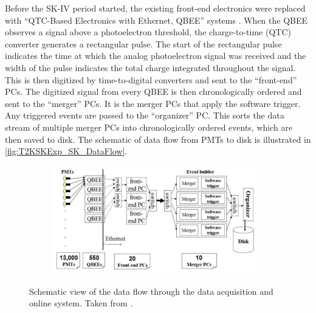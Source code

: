 Before the SK-IV period started, the existing front-end electronics were replaced with ``QTC-Based Electronics with Ethernet, QBEE'' systems \cite{Nishino2009-wh}. When the QBEE observes a signal above a  photoelectron threshold, the charge-to-time (QTC) converter generates a rectangular pulse. The start of the rectangular pulse indicates the time at which the analog photoelectron signal was received and the width of the pulse indicates the total charge integrated throughout the signal. This is then digitized by time-to-digital converters and sent to the ``front-end'' PCs. The digitized signal from every QBEE is then chronologically ordered and sent to the ``merger'' PCs. It is the merger PCs that apply the software trigger. Any triggered events are passed to the ``organizer'' PC. This sorts the data stream of multiple merger PCs into chronologically ordered events, which are then saved to disk. The schematic of data flow from PMTs to disk is illustrated in \autoref{fig:T2KSKExp_SK_DataFlow}.

\begin{figure}[h]
  \begin{subfigure}[t]{0.80\textwidth}
    \includegraphics[width=\textwidth, trim={0mm 0mm 0mm 0mm}, clip,page=1]{Figures/Detectors/SKDataFlow.pdf}
  \end{subfigure}
  \caption{Schematic view of the data flow through the data acquisition and online system. Taken from \cite{5446533}.}
  \label{fig:T2KSKExp_SK_DataFlow}
\end{figure}

